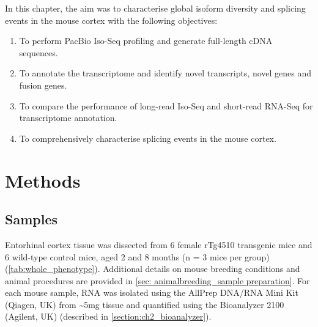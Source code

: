 \newpage
In this chapter, the aim was to characterise global isoform diversity and splicing events in the mouse cortex with the following objectives:
\begin{enumerate}
	\item To perform PacBio Iso-Seq profiling and generate full-length cDNA sequences. 
	\item To annotate the transcriptome and identify novel transcripts, novel genes and fusion genes.  
	\item To compare the performance of long-read Iso-Seq and short-read RNA-Seq for transcriptome annotation. 
	\item To comprehensively characterise splicing events in the mouse cortex.  	
\end{enumerate} 

\section{Methods}
\subsection{Samples}
Entorhinal cortex tissue was dissected from 6 female rTg4510 transgenic mice and 6 wild-type control mice, aged 2 and 8 months (n = 3 mice per group) (\cref{tab:whole_phenotype}). Additional details on mouse breeding conditions and animal procedures are provided in \cref{sec: animalbreeding_sample preparation}. For each mouse sample, RNA was isolated using the AllPrep DNA/RNA Mini Kit (Qiagen, UK) from \textasciitilde5mg tissue and quantified using the Bioanalyzer 2100 (Agilent, UK) (described in \cref{section:ch2_bioanalyzer}). 

